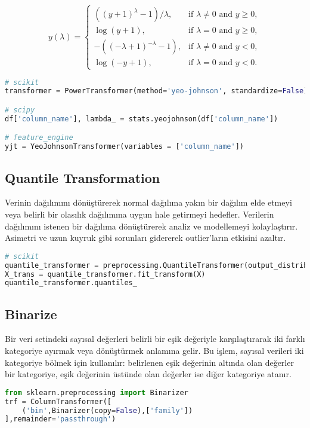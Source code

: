 \[y(\lambda) = 
\begin{cases} 
((y + 1)^\lambda - 1) / \lambda, & \text{if } \lambda \neq 0 \text{ and } y \geq 0, \\ 
\log(y + 1), & \text{if } \lambda = 0 \text{ and } y \geq 0, \\ 
-((-\lambda + 1)^{-\lambda} - 1), & \text{if } \lambda \neq 0 \text{ and } y < 0, \\ 
\log(-y + 1), & \text{if } \lambda = 0 \text{ and } y < 0. 
\end{cases}\]

\begin{lstlisting}[language=Python]
# scikit
transformer = PowerTransformer(method='yeo-johnson', standardize=False)

# scipy
df['column_name'], lambda_ = stats.yeojohnson(df['column_name'])

# feature_engine
yjt = YeoJohnsonTransformer(variables = ['column_name'])
\end{lstlisting}

\subsection{Quantile Transformation}
Verinin dağılımını dönüştürerek normal dağılıma yakın bir dağılım elde etmeyi veya belirli bir olasılık dağılımına uygun hale getirmeyi hedefler. Verilerin dağılımını istenen bir dağılıma dönüştürerek analiz ve modellemeyi kolaylaştırır. Asimetri ve uzun kuyruk gibi sorunları gidererek outlier'ların etkisini azaltır.

\begin{lstlisting}[language=Python]
# scikit
quantile_transformer = preprocessing.QuantileTransformer(output_distribution='normal', random_state=0)
X_trans = quantile_transformer.fit_transform(X)
quantile_transformer.quantiles_
\end{lstlisting}

\subsection{Binarize}
Bir veri setindeki sayısal değerleri belirli bir eşik değeriyle karşılaştırarak iki farklı kategoriye ayırmak veya dönüştürmek anlamına gelir. Bu işlem, sayısal verileri iki kategoriye bölmek için kullanılır: belirlenen eşik değerinin altında olan değerler bir kategoriye, eşik değerinin üstünde olan değerler ise diğer kategoriye atanır.

\begin{lstlisting}[language=Python]
from sklearn.preprocessing import Binarizer
trf = ColumnTransformer([
    ('bin',Binarizer(copy=False),['family'])
],remainder='passthrough')
\end{lstlisting}

